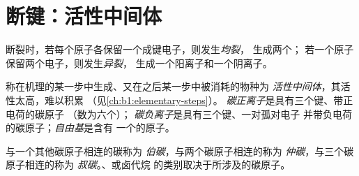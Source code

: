 \section{断键：活性中间体}

\begin{definition}[均裂与异裂]\label{def:b1:electronic-effects:cleavage}
断裂时，若每个原子各保留一个成键电子，则发生\emph{均裂}，
生成两个；
若一个原子保留两个电子，则发生\emph{异裂}，
生成一个阳离子和一个阴离子。
\end{definition}

\begin{definition}[活性中间体]\label{def:b1:electronic-effects:intermediates}
称在机理的某一步中生成、又在之后某一步中被消耗的物种为
\emph{活性中间体}，其活性太高，难以积累
（见\cref{ch:b1:elementary-steps}）。
\emph{碳正离子}是具有三个键、带正电荷的碳原子
（数为六个）；
\emph{碳负离子}是具有三个键、一对孤对电子
并带负电荷的碳原子；\emph{自由基}是含有
一个的原子。
\end{definition}

\begin{definition}[碳原子的类别]\label{def:b1:electronic-effects:carbon-class}
与一个其他碳原子相连的碳称为
\emph{伯碳}，与两个碳原子相连的称为
\emph{仲碳}，与三个碳原子相连的称为
\emph{叔碳}。、或卤代烷
的类别取决于所涉及的碳原子。
\end{definition}

